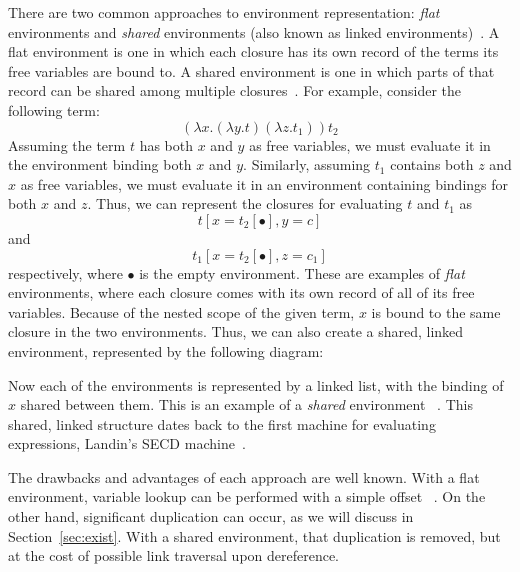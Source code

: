 There are two common approaches to environment representation: \emph{flat}
environments and \emph{shared} environments (also known as linked
environments)~\cite{appel1988optimizing,shao1994space}. A flat environment is
one in which each closure has its own record of the terms its free variables are
bound to. A shared environment is one in which parts of that record can be
shared among multiple closures~\cite{appel1988optimizing,shao1994space}. For
example, consider the following term: $$(\lambda x.(\lambda y.t) (\lambda
z.t_1)) t_2$$ Assuming the term $t$ has both $x$ and $y$ as free variables, we
must evaluate it in the environment binding both $x$ and $y$.  Similarly,
assuming $t_1$ contains both $z$ and $x$ as free variables, we must evaluate it
in an environment containing bindings for both $x$ and $z$. Thus, we can
represent the closures for evaluating $t$ and $t_1$  as $$t[x=t_2[\bullet],
y=c]$$ and $$t_1[x=t_2[\bullet], z=c_1]$$ respectively, where $\bullet$ is the
empty environment.  These are examples of \emph{flat} environments, where each
closure comes with its own record of all of its free variables. Because of the
nested scope of the given term, $x$ is bound to the same closure in the two
environments. Thus, we can also create a shared, linked environment,
represented by the following diagram:

\begin{center}
\end{center}
Now each of the environments is represented by a linked list, with the binding
of $x$ shared between them. This is an example of a \emph{shared} environment
~\cite{appel1988optimizing}. This shared, linked structure dates back to the 
first machine for evaluating expressions, Landin's SECD
machine~\cite{landin1964mechanical}.

The drawbacks and advantages of each approach are well known. With a flat
environment, variable lookup can be performed with a simple offset
~\cite{jonesstg,appel1992compiling}. On the other hand, significant
duplication can occur, as we will discuss in Section~\ref{sec:exist}.
With a shared environment, that duplication is removed, but at the cost of
possible link traversal upon dereference. 


